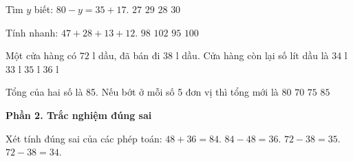 \begin{ex} %
Tìm $y$ biết: $80 - y = 35 + 17$.
\choice
{$27$}
{$29$}
{\True $28$}
{$30$}
\end{ex}

\begin{ex} %
Tính nhanh: $47 + 28 + 13 + 12$.
\choice
{$98$}
{$102$}
{$95$}
{\True $100$}
\end{ex}

\begin{ex} %
Một cửa hàng có $72\text{ l}$ dầu, đã bán đi $38\text{ l}$ dầu. Cửa hàng còn lại số lít dầu là
\choice
{\True $34\text{ l}$}
{$33\text{ l}$}
{$35\text{ l}$}
{$36\text{ l}$}
\end{ex}

\begin{ex} %
Tổng của hai số là 85. Nếu bớt ở mỗi số 5 đơn vị thì tổng mới là
\choice
{$80$}
{$70$}
{\True $75$}
{$85$}
\end{ex}

\textbf{Phần 2. Trắc nghiệm đúng sai}

\begin{ex} %
Xét tính đúng sai của các phép toán:
\choiceTF
{\True $48 + 36 = 84$.}
{\True $84 - 48 = 36$.}
{$72 - 38 = 35$.}
{\True $72 - 38 = 34$.}
\end{ex}

